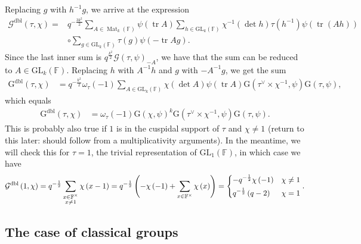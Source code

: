 \documentclass[12pt, reqno]{amsart}
\theoremstyle{definition}
\theoremstyle{definition}
\theoremstyle{definition}
\newcommand{\multiplicativegroup}[1]{#1^{\times}}
\newcommand{\fieldCharacter}{\psi}
\newcommand{\centralCharacter}[1]{\omega_{#1}}
\newcommand{\Contragradient}[1]{#1^{\vee}}
\newcommand{\trace}{\operatorname{tr}}
\newcommand{\GL}{\mathrm{GL}}
\newcommand{\finiteField}{\mathbb{F}}
\newcommand{\squareMatrix}{\operatorname{Mat}}
\newcommand{\GaussSum}[2]{\mathcal{G}\left(#1, #2\right)}
\newcommand{\dblGaussSum}[2]{\mathcal{G}^{\mathrm{dbl}}\left(#1, #2\right)}
\newcommand{\GaussSumScalar}[2]{\mathrm{G}\left(#1, #2\right)}
\newcommand{\dblGaussSumScalar}[2]{\mathrm{G}^{\mathrm{dbl}}\left(#1, #2\right)}
\begin{document}
Replacing $g$ with $h^{-1} g$, we arrive at the expression
\begin{align*}
	\dblGaussSum{\tau}{\chi} =& q^{-\frac{3k^2}{2}} \sum_{A \in \squareMatrix_k\left(\finiteField\right)} \fieldCharacter\left(\trace A\right) \sum_{h \in \GL_k\left(\finiteField\right)} \chi^{-1}\left(\det h\right) \tau\left(h^{-1}\right) \fieldCharacter\left(\trace\left(Ah\right)\right)\\
	& \circ \sum_{g \in \GL_k\left(\finiteField\right)} \tau\left(g\right) \fieldCharacter\left(-\trace Ag\right).
\end{align*}
Since the last inner sum is $q^{\frac{k^2}{2}} \GaussSum{\tau}{\fieldCharacter}_{-A}$, we have that the sum can be reduced to $A \in \GL_k\left(\finiteField\right)$. Replacing $h$ with $A^{-1} h$ and $g$ with $-A^{-1} g$, we get the sum
\begin{align*}
	\dblGaussSumScalar{\tau}{\chi} &= q^{-\frac{k^2}{2}} \centralCharacter{\tau}\left(-1\right) \sum_{A \in \GL_k\left(\finiteField\right)} \chi\left(\det A\right) \fieldCharacter\left(\trace A\right) \GaussSumScalar{\Contragradient{\tau} \times \chi^{-1}}{\fieldCharacter} \GaussSumScalar{\tau}{\fieldCharacter},
\end{align*}
which equals
\begin{align*}
	\dblGaussSumScalar{\tau}{\chi} &=  \centralCharacter{\tau}\left(-1\right) \GaussSumScalar{\chi}{\fieldCharacter}^k \GaussSumScalar{\Contragradient{\tau} \times \chi^{-1}}{\fieldCharacter} \GaussSumScalar{\tau}{\fieldCharacter}.
\end{align*}
This is probably also true if $1$ is in the cuspidal support of $\tau$  and $\chi \ne 1$ (return to this later: should follow from a multiplicativity arguments). In the meantime, we will check this for $\tau = 1$, the trivial representation of $\GL_1\left(\finiteField\right)$, in which case we have
$$\dblGaussSum{1}{\chi} = q^{-\frac{1}{2}} \sum_{\substack{x \in \multiplicativegroup{\finiteField} \\
		x \ne 1}} \chi\left(x - 1\right) = q^{-\frac{1}{2}}\left(-\chi\left(-1\right) + \sum_{x \in \multiplicativegroup{\finiteField}} \chi\left(x\right) \right) = \begin{dcases}
		-q^{-\frac{1}{2}} \chi\left(-1\right) & \chi \ne 1\\
		q^{-\frac{1}{2}} \left(q - 2\right) & \chi = 1
	\end{dcases}.$$

\subsection{The case of classical groups}
\end{document}
